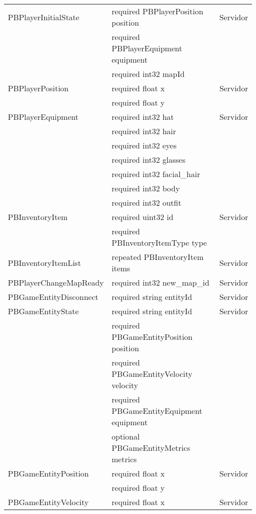 \begin{longtable}{|p{}|p{}|p{}|}
    \hline
    PBPlayerInitialState & required PBPlayerPosition position & Servidor \\
                            & required PBPlayerEquipment equipment & \\
                            & required int32 mapId & \\
    \hline
    PBPlayerPosition & required float x & Servidor \\
                        & required float y & \\
    \hline
    PBPlayerEquipment & required int32 hat & Servidor \\
                        & required int32 hair & \\
                        & required int32 eyes & \\
                        & required int32 glasses & \\
                        & required int32 facial\_hair & \\
                        & required int32 body & \\
                        & required int32 outfit & \\
    \hline
    PBInventoryItem & required uint32 id & Servidor \\
                    & required PBInventoryItemType type & \\
    \hline
    PBInventoryItemList & repeated PBInventoryItem items & Servidor \\
    \hline
    PBPlayerChangeMapReady & required int32 new\_map\_id & Servidor \\
    \hline
    PBGameEntityDisconnect & required string entityId & Servidor \\
    \hline
    PBGameEntityState & required string entityId & Servidor \\
                        & required PBGameEntityPosition position & \\
                        & required PBGameEntityVelocity velocity & \\
                        & required PBGameEntityEquipment equipment & \\
                        & optional PBGameEntityMetrics metrics & \\
    \hline
    PBGameEntityPosition & required float x & Servidor \\
                            & required float y & \\
    \hline
    PBGameEntityVelocity & required float x & Servidor \\

\end{longtable}
